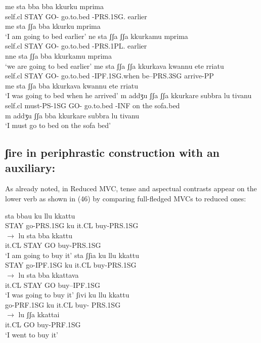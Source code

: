 \documentclass[output=paper,colorlinks,citecolor=brown,
]{langscibook}
\begin{document}
\ea
    \ea \gll *me    sta     bba   bba kkurku      mprima\\
    self.cl  STAY   GO-   go.to.bed -PRS.1SG.   earlier\\
    \glt me sta  ʃʃa bba kkurku mprima\\
     ‘I am going to bed earlier’
    \ex \gll *ne    sta     ʃʃa   ʃʃa kkurkamu       mprima\\
    self.cl  STAY     GO-  go.to.bed -PRS.1PL.   earlier\\
    \glt nne sta ʃʃa bba kkurkamu mprima\\
    ‘we are going to bed earlier’
    \ex \gll *me   sta  ʃʃa ʃʃa kkurkava      kwannu ete rriatu\\
    self.cl  STAY  GO- go.to.bed -IPF.1SG.when  be--PRS.3SG arrive-PP\\
    \glt me sta ʃʃa bba kkurkava kwannu ete rriatu\\
    ‘I was going to bed when he arrived’
    \ex \gll *m   addʒu     ʃʃa ʃʃa  kkurkare    subbra lu tivanu\\
     self.cl  must-PS-1SG  GO- go.to.bed -INF  on    the  sofa.bed\\
    \glt m addʒu ʃʃa bba kkurkare subbra lu tivanu\\
    ‘I must go to bed on the sofa bed’
    \z
\z

\subsection{ʃire in periphrastic construction with an auxiliary:}

As already noted, in Reduced MVC, tense and aspectual contrasts appear on the lower verb as shown in (46) by comparing full-fledged MVCs to reduced ones:

\ea
    \ea
        \ea \gll sta    bbau     ku   llu   kkattu\\
        STAY go-PRS.1SG  ku   it.CL buy-PRS.1SG   \\
        \ex $\rightarrow$ \gll lu    sta    bba  kkattu\\
        it.CL  STAY GO  buy-PRS.1SG \\
        \glt ‘I am going to buy it’
        \z
    \ex
        \ea  \gll sta    ʃʃia       ku   llu    kkattu \\
       STAY go-IPF.1SG  ku   it.CL  buy-PRS.1SG  \\
        \ex  $\rightarrow$ \gll lu    sta    bba   kkattava\\
       it.CL   STAY GO   buy--IPF.1SG\\
       \glt ‘I was going to buy it’
        \z
    \ex
        \ea  \gll ʃivi       ku   llu   kkattu \\
       go-PRF.1SG  ku   it.CL  buy- PRS.1SG \\
        \ex  $\rightarrow$ \gll lu     ʃʃa   kkattai\\
       it.CL   GO  buy-PRF.1SG\\
       \glt ‘I went to buy it’
        \z
    \z
\z
\end{document}
